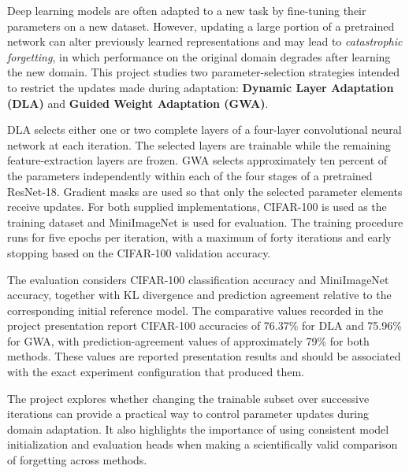 \documentclass[12pt,a4paper]{report}
\begin{document}
Deep learning models are often adapted to a new task by fine-tuning their
parameters on a new dataset. However, updating a large portion of a
pretrained network can alter previously learned representations and may
lead to \emph{catastrophic forgetting}, in which performance on the
original domain degrades after learning the new domain. This project
studies two parameter-selection strategies intended to restrict the
updates made during adaptation: \textbf{Dynamic Layer Adaptation (DLA)}
and \textbf{Guided Weight Adaptation (GWA)}.

DLA selects either one or two complete layers of a four-layer
convolutional neural network at each iteration. The selected layers are
trainable while the remaining feature-extraction layers are frozen.
GWA selects approximately ten percent of the parameters independently
within each of the four stages of a pretrained ResNet-18. Gradient masks
are used so that only the selected parameter elements receive updates.
For both supplied implementations, CIFAR-100 is used as the training
dataset and MiniImageNet is used for evaluation. The training procedure
runs for five epochs per iteration, with a maximum of forty iterations
and early stopping based on the CIFAR-100 validation accuracy.

The evaluation considers CIFAR-100 classification accuracy and
MiniImageNet accuracy, together with KL divergence and prediction
agreement relative to the corresponding initial reference model.
The comparative values recorded in the project presentation report
CIFAR-100 accuracies of 76.37\% for DLA and 75.96\% for GWA, with
prediction-agreement values of approximately 79\% for both methods.
These values are reported presentation results and should be associated
with the exact experiment configuration that produced them.

The project explores whether changing the trainable subset over
successive iterations can provide a practical way to control parameter
updates during domain adaptation. It also highlights the importance of
using consistent model initialization and evaluation heads when making
a scientifically valid comparison of forgetting across methods.

\clearpage
\tableofcontents
\clearpage
\listoffigures
\listoftables

\clearpage
{}
\end{document}
